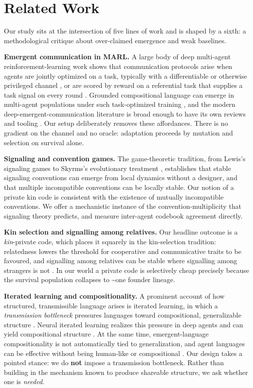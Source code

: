 \documentclass[12pt,letterpaper]{article}
\begin{document}
\section{Related Work}

Our study sits at the intersection of five lines of work and is shaped by a sixth:
a methodological critique about over-claimed emergence and weak baselines.

\textbf{Emergent communication in MARL.} A large body of deep multi-agent
reinforcement-learning work shows that communication protocols arise when agents are jointly
optimized on a task, typically with a differentiable or otherwise privileged channel
\citep{foerster2016}, or are scored by reward on a referential task that supplies a task
signal on every round \citep{lazaridou2017}. Grounded compositional language can emerge in
multi-agent populations under such task-optimized training \citep{mordatch2018}, and the
modern deep-emergent-communication literature is broad enough to have its own reviews and
tooling \citep{lazaridoubaroni2020,kharitonov2019}. Our setup deliberately removes these
affordances. There is no gradient on the channel and no oracle: adaptation proceeds by
mutation and selection on survival alone.

\textbf{Signaling and convention games.} The game-theoretic tradition, from Lewis's
signaling games \citep{lewis1969} to Skyrms's evolutionary treatment \citep{skyrms2010},
establishes that stable signaling conventions can emerge from local dynamics without a
designer, and that multiple incompatible conventions can be locally stable. Our notion of a
private kin code is consistent with the existence of mutually incompatible conventions. We
offer a mechanistic instance of the convention-multiplicity that signaling theory predicts,
and measure inter-agent codebook agreement directly.

\textbf{Kin selection and signalling among relatives.} Our headline outcome is a
\emph{kin}-private code, which places it squarely in the kin-selection tradition:
relatedness lowers the threshold for cooperative and communicative traits to be favoured,
and signalling among relatives can be stable where signalling among strangers is not
\citep{hamilton1964}. In our world a private code is selectively cheap precisely because
the survival population collapses to \textasciitilde{}one founder lineage.

\textbf{Iterated learning and compositionality.} A prominent account of how structured,
transmissible language arises is iterated learning, in which a \emph{transmission
bottleneck} pressures languages toward compositional, generalizable structure
\citep{kirby2008}. Neural iterated learning realizes this pressure in deep agents and can
yield compositional structure \citep{ren2020}. At the same time, emergent-language
compositionality is not automatically tied to generalization, and agent languages can be
effective without being human-like or compositional
\citep{kottur2017,chaabouni2020}. Our design takes a pointed stance: we do
\textbf{not} impose a transmission bottleneck. Rather than building in the mechanism known
to produce shareable structure, we ask whether one is \emph{needed}.
\end{document}
